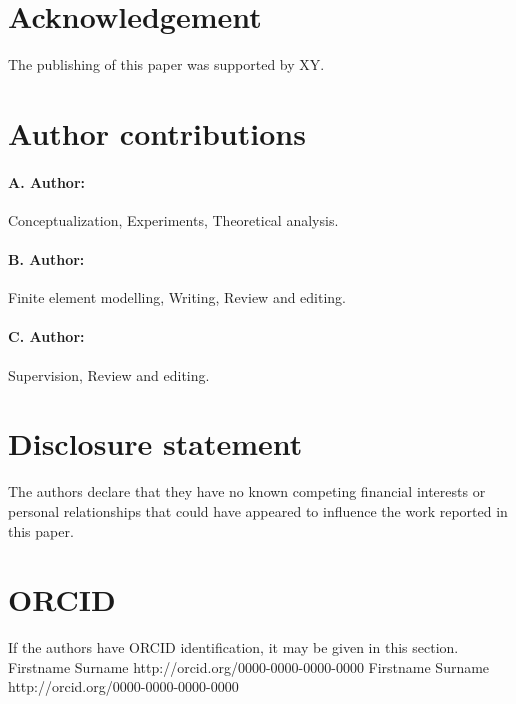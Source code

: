 \documentclass[10pt,a4paper,twocolumns]{article}
\begin{document}
\section*{Acknowledgement}
The publishing of this paper was supported by XY.

\section*{Author contributions}

\paragraph{A. Author:} Conceptualization, Experiments, Theoretical analysis.
\paragraph{B. Author:} Finite element modelling, Writing, Review and editing.
\paragraph{C. Author:} Supervision, Review and editing.

\section*{Disclosure statement}
The authors declare that they have no known competing financial interests or personal relationships that could have appeared to influence the work reported in this paper.

\section*{ORCID}

If the authors have ORCID identification, it may be given in this section.
Firstname Surname http://orcid.org/0000-0000-0000-0000
Firstname Surname http://orcid.org/0000-0000-0000-0000








\end{document}
